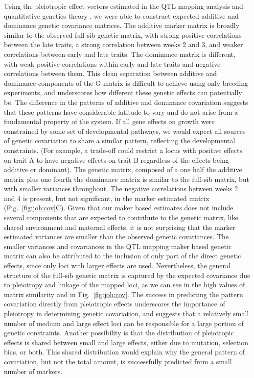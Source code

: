\begin{refsection}
Using the pleiotropic effect vectors estimated in the QTL mapping
analysis and quantitative genetics theory \parencite{Kelly2009-bj}, we were able
to construct expected additive and dominance genetic covariance
matrices. The additive marker matrix is broadly similar to the observed
full-sib genetic matrix, with strong positive correlations between the
late traits, a strong correlation between weeks 2 and 3, and weaker
correlations between early and late traits. The dominance matrix is
different, with weak positive correlations within early and late traits
and negative correlations between them. This clean separation between
additive and dominance components of the G-matrix is difficult to
achieve using only breeding experiments, and underscores how different
these genetic effects can potentially be. The difference in the patterns
of additive and dominance covariation suggests that these patterns have
considerable latitude to vary and do not arise from a fundamental
property of the system. If all gene effects on growth were constrained
by some set of developmental pathways, we would expect all sources of
genetic covariation to share a similar pattern, reflecting the
developmental constraints. (For example, a trade-off could restrict a
locus with positive effects on trait A to have negative effects on trait
B regardless of the effects being additive or dominant). The genetic
matrix, composed of a one half the additive matrix plus one fourth the
dominance matrix is similar to the full-sib matrix, but with smaller
variances throughout. The negative correlations between weeks 2 and 4 is
present, but not significant, in the marker estimated matrix (Fig.~\ref{fig:joh:cov}C).
Given that our maker based estimates does not include several components
that are expected to contribute to the genetic matrix, like shared
environment and maternal effects, it is not surprising that the marker
estimated variances are smaller than the observed genetic covariances.
The smaller variances and covariances in the QTL mapping maker based
genetic matrix can also be attributed to the inclusion of only part of
the direct genetic effects, since only loci with larger effects are
used. Nevertheless, the general structure of the full-sib genetic matrix
is captured by the expected covariance due to pleiotropy and linkage of
the mapped loci, as we can see in the high values of matrix similarity
and in Fig.~\ref{fig:joh:cov}. The success in predicting the pattern covariation
directly from pleiotropic effects underscores the importance of
pleiotropy in determining genetic covariation, and suggests that a
relatively small number of medium and large effect loci can be
responsible for a large portion of genetic constraints. Another
possibility is that the distribution of pleiotropic effects is shared
between small and large effects, either due to mutation, selection bias,
or both. This shared distribution would explain why the general pattern
of covariation, but not the total amount, is successfully predicted from
a small number of markers.


\end{refsection}
